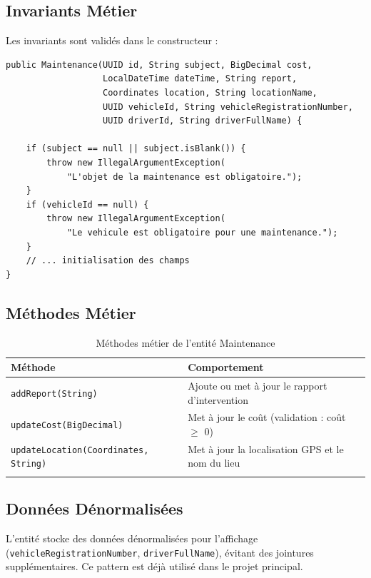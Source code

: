 \documentclass[12pt,a4paper]{report}
\begin{document}
\subsection{Invariants Métier}

Les invariants sont validés dans le constructeur :

\begin{lstlisting}[style=javaStyle, caption={Invariants métier de Maintenance}]
public Maintenance(UUID id, String subject, BigDecimal cost,
                   LocalDateTime dateTime, String report,
                   Coordinates location, String locationName,
                   UUID vehicleId, String vehicleRegistrationNumber,
                   UUID driverId, String driverFullName) {

    if (subject == null || subject.isBlank()) {
        throw new IllegalArgumentException(
            "L'objet de la maintenance est obligatoire.");
    }
    if (vehicleId == null) {
        throw new IllegalArgumentException(
            "Le vehicule est obligatoire pour une maintenance.");
    }
    // ... initialisation des champs
}
\end{lstlisting}

\subsection{Méthodes Métier}

\begin{longtable}{p{5cm}p{8cm}}
\toprule
\textbf{Méthode} & \textbf{Comportement} \\
\midrule
\endhead
\texttt{addReport(String)} & Ajoute ou met à jour le rapport d'intervention \\
\texttt{updateCost(BigDecimal)} & Met à jour le coût (validation : coût $\geq$ 0) \\
\texttt{updateLocation(Coordinates, String)} & Met à jour la localisation GPS et le nom du lieu \\
\bottomrule
\caption{Méthodes métier de l'entité Maintenance}
\end{longtable}

\subsection{Données Dénormalisées}

L'entité stocke des données dénormalisées pour l'affichage (\texttt{vehicleRegistrationNumber}, \texttt{driverFullName}), évitant des jointures supplémentaires. Ce pattern est déjà utilisé dans le projet principal.
\end{document}
